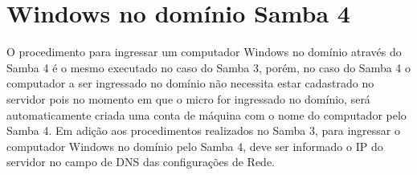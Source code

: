 



\section{Windows no domínio Samba 4}

O procedimento para ingressar um computador Windows no domínio através do Samba 4 é o mesmo executado no caso do Samba 3, porém, no caso do Samba 4 o computador a ser ingressado no domínio não necessita estar cadastrado no servidor pois no momento em que o micro for ingressado no domínio, será automaticamente criada uma conta de máquina com o nome do computador pelo Samba 4.
Em adição aos procedimentos realizados no Samba 3, para ingressar o computador Windows no domínio pelo Samba 4, deve ser informado o IP do servidor no campo de DNS das configurações de Rede.